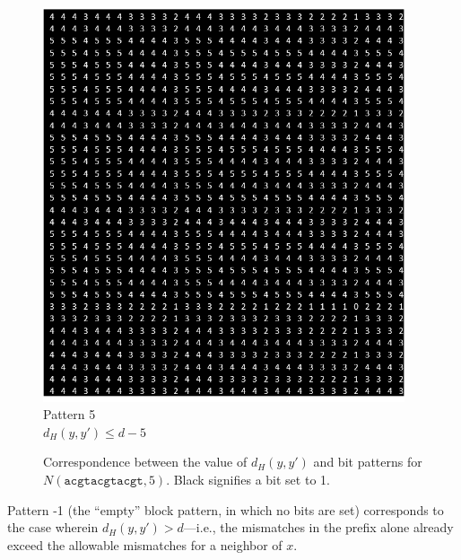 \documentclass[oneside,12pt]{DISCSthesis}
\begin{document}
{\begin{figure}[h]
			\begin{minipage}{.33\textwidth}\centering\includegraphics[width=0.95\textwidth]{img/5}\\ Pattern 5 \\$d_H(y,y')\leq d-5$ \end{minipage}
			\newline\newline
			\caption{Correspondence between the value of $d_H(y,y')$ and bit patterns for $N(\texttt{acgtacgtacgt}, 5)$. Black signifies a bit set to 1.}
			\end{figure}

		\noindent Pattern -1 (the ``empty'' block pattern, in which no bits are set) corresponds to the case wherein $d_H(y,y') > d$---i.e., the mismatches in the prefix alone already exceed the allowable mismatches for a neighbor of $x$.

}
\end{document}
